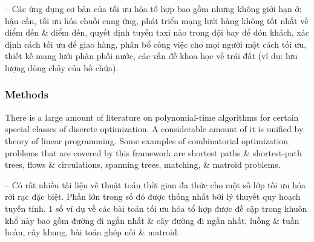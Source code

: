 \documentclass{article}
\begin{document}
-- Các ứng dụng cơ bản của tối ưu hóa tổ hợp bao gồm nhưng không giới hạn ở: hậu cần, tối ưu hóa chuỗi cung ứng, phát triển mạng lưới hàng không tốt nhất về điểm đến \& điểm đến, quyết định tuyến taxi nào trong đội bay để đón khách, xác định cách tối ưu để giao hàng, phân bổ công việc cho mọi người một cách tối ưu, thiết kế mạng lưới phân phối nước, các vấn đề khoa học về trái đất (ví dụ: lưu lượng dòng chảy của hồ chứa).


\subsubsection{Methods}
There is a large amount of literature on polynomial-time algorithms for certain special classes of discrete optimization. A considerable amount of it is unified by theory of linear programming. Some examples of combinatorial optimization problems that are covered by this framework are shortest paths \& shortest-path trees, flows \& circulations, spanning trees, matching, \& matroid problems.

-- Có rất nhiều tài liệu về thuật toán thời gian đa thức cho một số lớp tối ưu hóa rời rạc đặc biệt. Phần lớn trong số đó được thống nhất bởi lý thuyết quy hoạch tuyến tính. 1 số ví dụ về các bài toán tối ưu hóa tổ hợp được đề cập trong khuôn khổ này bao gồm đường đi ngắn nhất \& cây đường đi ngắn nhất, luồng \& tuần hoàn, cây khung, bài toán ghép nối \& matroid.
\end{document}
